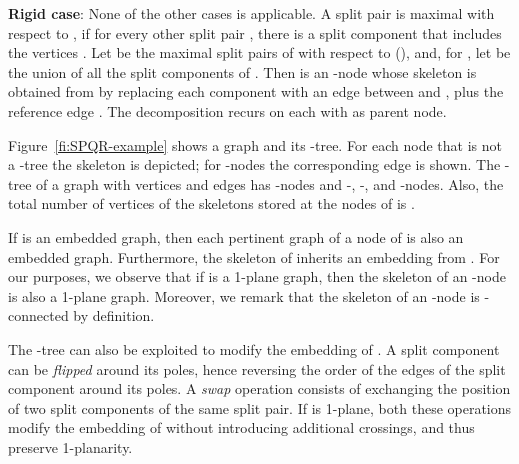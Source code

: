 \documentclass{article}
\begin{document}
\textbf{Rigid case}: None of the other cases is applicable.
A split pair  is maximal with respect to , if for every other split pair , there is a split component that includes the vertices .
Let  be the maximal split pairs of  with respect to  (), and, for , let  be the union of all the split components of .
Then  is an -node whose skeleton is obtained from  by replacing each component  with an edge between  and , plus the reference edge .
The decomposition recurs on each  with  as parent node.


\medskip

Figure~\ref{fi:SPQR-example} shows a graph and its -tree. For each node that is not a -tree the skeleton is depicted; for -nodes the corresponding edge is shown. The -tree  of a graph  with  vertices and  edges has  -nodes and  -, -, and -nodes. Also, the total number of vertices of the skeletons stored at the nodes of  is .


\medskip

If  is an embedded graph, then each pertinent graph  of a node  of  is also an embedded graph.  Furthermore, the skeleton  of  inherits an embedding from . For our purposes, we observe that if  is a 1-plane graph, then the skeleton of an -node is also a 1-plane graph. Moreover, we remark that the skeleton of an -node is -connected by definition.

The -tree can also be exploited to modify the embedding of . A  split component can be \emph{flipped} around its poles, hence reversing the order of the edges of the split component around its poles.  A \emph{swap} operation consists of exchanging the position of two split components of the same split pair. If  is 1-plane, both these operations modify the embedding of  without introducing additional crossings, and thus preserve 1-planarity.

\clearpage{}
\end{document}
